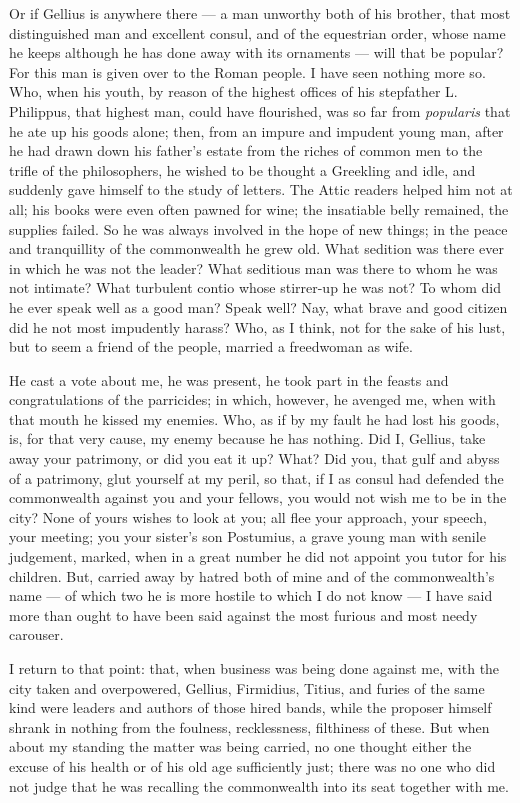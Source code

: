  Or if Gellius is anywhere there --- a man unworthy both of his brother, that most distinguished man and excellent consul, and of the equestrian order, whose name he keeps although he has done away with its ornaments --- will that be popular? For this man is given over to the Roman people. I have seen nothing more so. Who, when his youth, by reason of the highest offices of his stepfather L. Philippus, that highest man, could have flourished, was so far from \textit{popularis} that he ate up his goods alone; then, from an impure and impudent young man, after he had drawn down his father's estate from the riches of common men to the trifle of the philosophers, he wished to be thought a Greekling and idle, and suddenly gave himself to the study of letters. The Attic readers helped him not at all; his books were even often pawned for wine; the insatiable belly remained, the supplies failed. So he was always involved in the hope of new things; in the peace and tranquillity of the commonwealth he grew old. What sedition was there ever in which he was not the leader? What seditious man was there to whom he was not intimate? What turbulent contio whose stirrer-up he was not? To whom did he ever speak well as a good man? Speak well? Nay, what brave and good citizen did he not most impudently harass? Who, as I think, not for the sake of his lust, but to seem a friend of the people, married a freedwoman as wife.

 He cast a vote about me, he was present, he took part in the feasts and congratulations of the parricides; in which, however, he avenged me, when with that mouth he kissed my enemies. Who, as if by my fault he had lost his goods, is, for that very cause, my enemy because he has nothing. Did I, Gellius, take away your patrimony, or did you eat it up? What? Did you, that gulf and abyss of a patrimony, glut yourself at my peril, so that, if I as consul had defended the commonwealth against you and your fellows, you would not wish me to be in the city? None of yours wishes to look at you; all flee your approach, your speech, your meeting; you your sister's son Postumius, a grave young man with senile judgement, marked, when in a great number he did not appoint you tutor for his children. But, carried away by hatred both of mine and of the commonwealth's name --- of which two he is more hostile to which I do not know --- I have said more than ought to have been said against the most furious and most needy carouser.

 I return to that point: that, when business was being done against me, with the city taken and overpowered, Gellius, Firmidius, Titius, and furies of the same kind were leaders and authors of those hired bands, while the proposer himself shrank in nothing from the foulness, recklessness, filthiness of these. But when about my standing the matter was being carried, no one thought either the excuse of his health or of his old age sufficiently just; there was no one who did not judge that he was recalling the commonwealth into its seat together with me.


